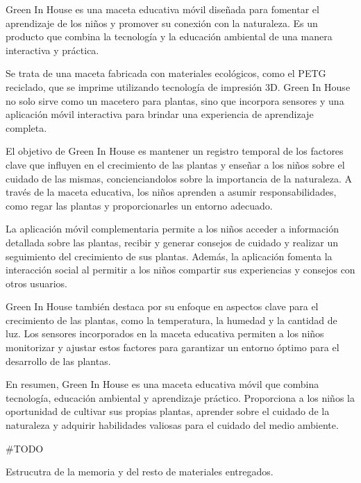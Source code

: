 
Green In House es una maceta educativa móvil diseñada para fomentar el aprendizaje de los niños y promover su conexión con la naturaleza. Es un producto que combina la tecnología y la educación ambiental de una manera interactiva y práctica.

Se trata de una maceta fabricada con materiales ecológicos, como el PETG reciclado, que se imprime utilizando tecnología de impresión 3D. Green In House no solo sirve como un macetero para plantas, sino que incorpora sensores y una aplicación móvil interactiva para brindar una experiencia de aprendizaje completa.

El objetivo de Green In House es mantener un registro temporal de los factores clave que influyen en el crecimiento de las plantas y enseñar a los niños sobre el cuidado de las mismas, concienciandolos sobre la importancia de la naturaleza. A través de la maceta educativa, los niños aprenden a asumir responsabilidades, como regar las plantas y proporcionarles un entorno adecuado.

La aplicación móvil complementaria permite a los niños acceder a información detallada sobre las plantas, recibir y generar consejos de cuidado y realizar un seguimiento del crecimiento de sus plantas. Además, la aplicación fomenta la interacción social al permitir a los niños compartir sus experiencias y consejos con otros usuarios.

Green In House también destaca por su enfoque en aspectos clave para el crecimiento de las plantas, como la temperatura, la humedad y la cantidad de luz. Los sensores incorporados en la maceta educativa permiten a los niños monitorizar y ajustar estos factores para garantizar un entorno óptimo para el desarrollo de las plantas.

En resumen, Green In House es una maceta educativa móvil que combina tecnología, educación ambiental y aprendizaje práctico. Proporciona a los niños la oportunidad de cultivar sus propias plantas, aprender sobre el cuidado de la naturaleza y adquirir habilidades valiosas para el cuidado del medio ambiente.




#TODO

Estrucutra de la memoria y del resto de materiales entregados.
